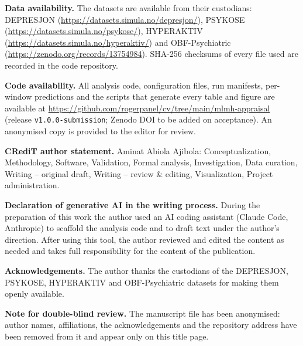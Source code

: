 \documentclass[11pt,a4paper]{article}
\begin{document}
\textbf{Data availability.} The datasets are available from their custodians: DEPRESJON (\url{https://datasets.simula.no/depresjon/}), PSYKOSE (\url{https://datasets.simula.no/psykose/}), HYPERAKTIV (\url{https://datasets.simula.no/hyperaktiv/}) and OBF-Psychiatric (\url{https://zenodo.org/records/13754984}). SHA-256 checksums of every file used are recorded in the code repository.

\textbf{Code availability.} All analysis code, configuration files, run manifests, per-window predictions and the scripts that generate every table and figure are available at \url{https://github.com/rogerpanel/cv/tree/main/mlmh-appraisal} (release \texttt{v1.0.0-submission}; Zenodo DOI to be added on acceptance). An anonymised copy is provided to the editor for review.

\textbf{CRediT author statement.} Aminat Abiola Ajibola: Conceptualization, Methodology, Software, Validation, Formal analysis, Investigation, Data curation, Writing -- original draft, Writing -- review \& editing, Visualization, Project administration.

\textbf{Declaration of generative AI in the writing process.} During the preparation of this work the author used an AI coding assistant (Claude Code, Anthropic) to scaffold the analysis code and to draft text under the author's direction. After using this tool, the author reviewed and edited the content as needed and takes full responsibility for the content of the publication.

\textbf{Acknowledgements.} The author thanks the custodians of the DEPRESJON, PSYKOSE, HYPERAKTIV and OBF-Psychiatric datasets for making them openly available.

\textbf{Note for double-blind review.} The manuscript file has been anonymised: author names, affiliations, the acknowledgements and the repository address have been removed from it and appear only on this title page.
\end{document}
